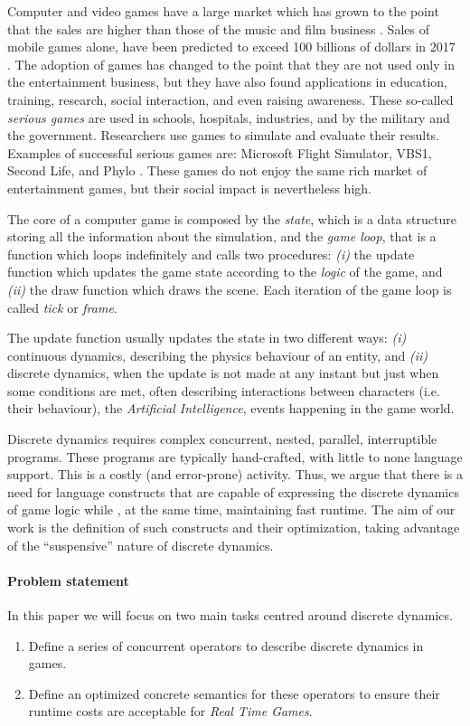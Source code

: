 Computer and video games have a large market which has grown to the point that the sales are higher than those of the music and film business \cite{ESAreport}. Sales of mobile games alone, have been predicted to exceed 100 billions of dollars in 2017 \cite{GLOBAL:GAMES:INVESTMENT:REVIEW:2014}. The adoption of games has changed to the point that they are not used only in the entertainment business, but they have also found applications in education, training, research, social interaction, and even raising awareness. These so-called \textit{serious games} are used in schools, hospitals, industries, and by the military and the government. Researchers use games to simulate and evaluate their results. Examples of successful serious games are: Microsoft Flight Simulator, VBS1, Second Life, and Phylo \cite{seriousgameslist}. These games do not enjoy the same rich market of entertainment games, but their social impact is nevertheless high.

The core of a computer game is composed by the \textit{state}, which is a data structure storing all the information about the simulation, and the \textit{game loop}, that is a function which loops indefinitely and calls two procedures: \textit{(i)} the update function which updates the game state according to the \emph{logic} of the game, and \textit{(ii)} the draw function which draws the scene. Each iteration of the game loop is called \textit{tick} or \textit{frame}.

The update function usually updates the state in two different ways: \textit{(i)} continuous dynamics, describing the physics behaviour of an entity, and \textit{(ii)} discrete dynamics, when the update is not made at any instant but just when some conditions are met, often describing interactions between characters (i.e. their behaviour), the \textit{Artificial Intelligence}, events happening in the game world.

Discrete dynamics requires complex concurrent, nested, parallel, interruptible programs. These programs are typically hand-crafted, with little to none language support. This is a costly (and error-prone) activity.
Thus, we argue that there is a need for language constructs that are capable of expressing the discrete dynamics of game logic while , at the same time, maintaining fast runtime. The aim of our work is the definition of such constructs and their optimization, taking advantage of the ``suspensive'' nature of discrete dynamics.

\paragraph{Problem statement}
In this paper we will focus on two main tasks centred around discrete dynamics.
\begin{enumerate}
\item Define a series of concurrent operators to describe discrete dynamics in games.
\item Define an optimized concrete semantics for these operators to ensure their runtime costs are acceptable for \textit{Real Time Games}.
\end{enumerate}

